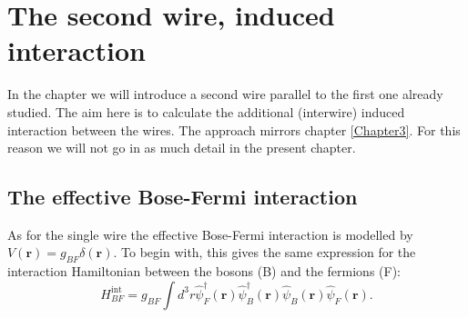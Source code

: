 
\chapter{The second wire, induced interaction} %

\label{Chapter8} %


In the chapter we will introduce a second wire parallel to the first one already studied. The aim here is to calculate the additional (interwire) induced interaction between the wires. The approach mirrors chapter \ref{Chapter3}. For this reason we will not go in as much detail in the present chapter.
\section{The effective Bose-Fermi interaction} 
As for the single wire the effective Bose-Fermi interaction is modelled by $V(\mathbf{r}) = g_{BF}\delta(\mathbf{r})$. To begin with, this gives the same expression for the interaction Hamiltonian between the bosons (B) and the fermions (F):
\begin{equation}
H_{BF}^\text{int} = g_{BF}\int d^3 r \hat{\psi}_F^\dagger(\mathbf{r}) \hat{\psi}_B^\dagger(\mathbf{r})\hat{\psi}_B(\mathbf{r})\hat{\psi}_F(\mathbf{r}).
\end{equation}

